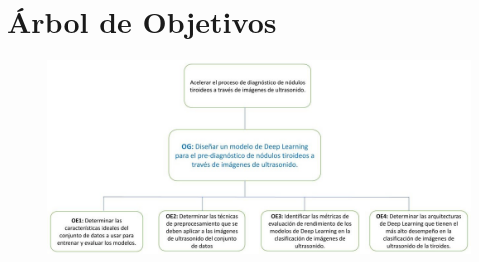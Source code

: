 	\section{Árbol de Objetivos}
	\label{anexo2}
	\begin{figure}[h]
		\begin{center}
			\includegraphics[width=1.00\textwidth]{anexos/arb_objetivos.jpg}
		\end{center}
	\end{figure}
	\clearpage
	
